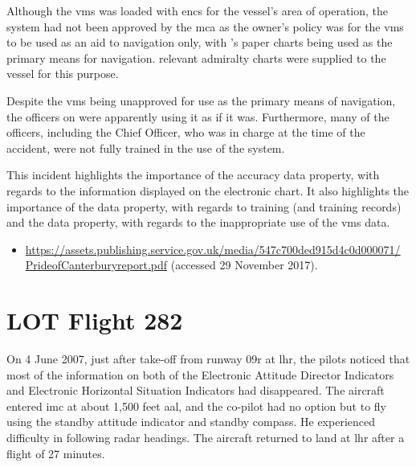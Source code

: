 Although the \gls{vms} was loaded with \glspl{enc} for the vessel's area of operation, the system had not been approved by the \gls{mca} as the owner's policy was for the \gls{vms} to be used as an aid to navigation only, with 's paper charts being used as the primary means for navigation. relevant admiralty charts were supplied to the vessel for this purpose.

Despite the \gls{vms} being unapproved for use as the primary means of navigation, the officers on  were apparently using it as if it was. Furthermore, many of the officers, including the Chief Officer, who was in charge at the time of the accident, were not fully trained in the use of the system.

This incident highlights the importance of the \gls{accuracy} \gls{data property}, with regards to the \gls{information} displayed on the electronic chart. It also highlights the importance of the  \gls{data property}, with regards to training (and training records) and the  \gls{data property}, with regards to the inappropriate use of the \gls{vms} data.

\begin{samepage}
\begin{itemize}
  \item \raggedright{\href{https://assets.publishing.service.gov.uk/media/547c700ded915d4c0d000071/PrideofCanterburyreport.pdf}{https://assets.publishing.service.gov.uk/media/547c700ded915d4c0d000071/ PrideofCanterburyreport.pdf} (accessed 29 November 2017).}
\end{itemize}
\end{samepage}


\section{LOT Flight 282} \label{bkm:incacc:lot282}
On 4 June 2007, just after take-off from runway 09r at \gls{lhr}, the pilots noticed that most of the \gls{information} on both of the Electronic Attitude Director Indicators and Electronic Horizontal Situation Indicators had disappeared. The aircraft entered \gls{imc} at about 1,500 feet \gls{aal}, and the co-pilot had no option but to fly using the standby attitude indicator and standby compass. He experienced difficulty in following radar headings. The aircraft returned to land at \gls{lhr} after a flight of 27 minutes.


